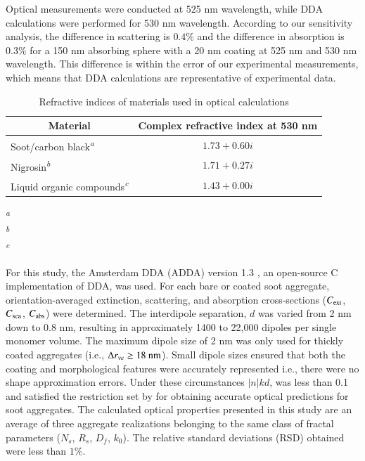 Optical measurements were conducted at 525 nm wavelength, while DDA calculations were performed for 530 nm wavelength. According to our sensitivity analysis, the difference in scattering is $0.4 \%$ and the difference in absorption is $0.3 \%$ for a 150 nm absorbing sphere with a 20 nm coating at 525 nm and 530 nm wavelength. This difference is within the error of our experimental measurements, which means that DDA calculations are representative of experimental data.

\begin{table}[ht]
\caption{Refractive indices of materials used in optical calculations}
\label{tab:refindices}
\begin{center}
\begin{tabular}{l c}
 \hline
 \multicolumn{1}{c}{Material} & Complex refractive index at 530 nm \\
 \hline
 Soot/carbon black\textsuperscript{\textit{a}} & $1.73+0.60i$\\
 Nigrosin\textsuperscript{\textit{b}} & $1.71+0.27i$\\
 Liquid organic compounds\textsuperscript{\textit{c}} & $1.43+0.00i$\\
 \hline
\end{tabular}
\end{center}

\textsuperscript{\textit{a}}\citet{RN23}\\
\textsuperscript{\textit{b}}\citet{RN15}\\
\textsuperscript{\textit{c}}\citet{RN22}
\end{table}

For this study, the Amsterdam DDA (ADDA) version 1.3 \citep{RN11}, an open-source C implementation of DDA, was used. For each bare or coated soot aggregate, orientation-averaged extinction, scattering, and absorption cross-sections ($C_{\rm ext}$, $C_{\rm sca}$, $C_{\rm abs}$) were determined. The interdipole separation, $d$ was varied from 2 nm down to 0.8 nm, resulting in approximately 1400 to 22,000 dipoles per single monomer volume. The maximum dipole size of 2 nm was only used for thickly coated aggregates (i.e., $\Delta r_{ve}\ge 18\ \rm nm$). Small dipole sizes ensured that both the coating and morphological features were accurately represented i.e., there were no shape approximation errors. Under these circumstances $|n|kd$, was less than 0.1 and satisfied the restriction set by \citet{RN32} for obtaining accurate optical predictions for soot aggregates. The calculated optical properties presented in this study are an average of three aggregate realizations belonging to the same class of fractal parameters ($N_s$, $R_s$, $D_f$, $k_0$). The relative standard deviations (RSD) obtained were less than $1\%$.
